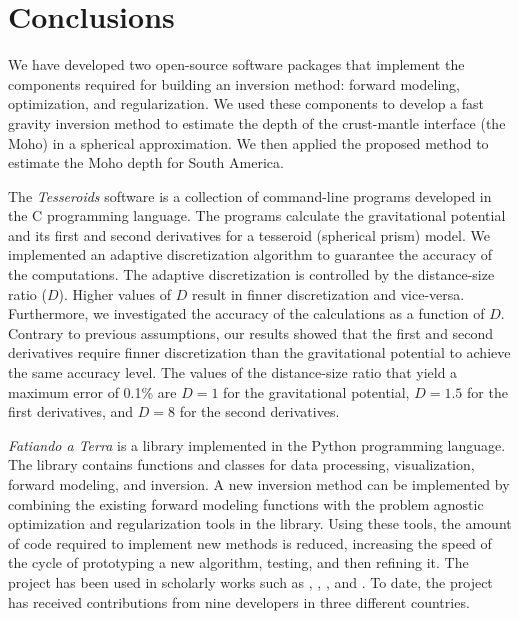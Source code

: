 \chapter{Conclusions}


We have developed two open-source software packages that implement the
components required for building an inversion method: forward modeling,
optimization, and regularization.
We used these components to develop a fast gravity inversion method to estimate
the depth of the crust-mantle interface (the Moho) in a spherical
approximation.
We then applied the proposed method to estimate the Moho depth for South
America.

The \textit{Tesseroids} software is a collection of command-line
programs developed in the C programming language.
The programs calculate the gravitational potential and its first and second
derivatives for a tesseroid (spherical prism) model.
We implemented an adaptive discretization algorithm to guarantee the accuracy
of the computations.
The adaptive discretization is controlled by the distance-size
ratio ($D$).
Higher values of $D$ result in finner discretization and vice-versa.
Furthermore, we investigated the accuracy of the calculations as a function of
$D$.
Contrary to previous assumptions, our results showed that the first and second
derivatives require finner discretization than the gravitational potential to
achieve the same accuracy level.
The values of the distance-size ratio that yield a maximum error of 0.1\%
are $D = 1$ for the gravitational potential, $D = 1.5$ for the first
derivatives, and $D = 8$ for the second derivatives.

\textit{Fatiando a Terra} is a library implemented in the Python programming
language.
The library contains functions and classes for data processing, visualization,
forward modeling, and inversion.
A new inversion method can be implemented by combining the existing forward
modeling functions with the problem agnostic optimization and regularization
tools in the library.
Using these tools, the amount of code required to implement new methods is
reduced, increasing the speed of the cycle of prototyping a new algorithm,
testing, and then refining it.
The project has been used in scholarly works such as
\citet{hidalgo-gato2015a}, \citet{niccoli2015}, \citet{oliveirajr.2015},
and \citet{bassett2016}.
To date, the project has received contributions from nine developers in three
different countries.

